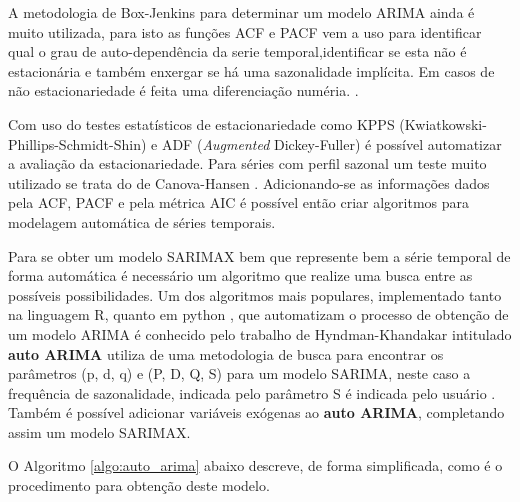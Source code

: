 A metodologia de Box-Jenkins \cite{hipel1977advances} para determinar um modelo ARIMA ainda é muito utilizada, para isto as funções ACF e PACF vem a uso para identificar qual o grau de auto-dependência da serie temporal,identificar se esta não é estacionária e também enxergar se há uma sazonalidade implícita. Em casos de não estacionariedade é feita uma diferenciação numéria. \cite{hipel1977advances,atique2019forecasting, hyndman2020forecasting}.

Com uso do testes estatísticos de estacionariedade como KPPS (Kwiatkowski\hyp{}Phillips\hyp{}Schmidt\hyp{}Shin) \cite{kwiatkowski1992testing} e ADF (\textit{Augmented} Dickey\hyp{}Fuller) \cite{dickey1979distribution} é possível automatizar a avaliação da estacionariedade. Para séries com perfil sazonal um teste muito utilizado se trata do de Canova-Hansen \cite{canova1995seasonal}. Adicionando-se as informações dados pela ACF, PACF e pela métrica AIC é possível então criar algoritmos para modelagem automática de séries temporais.

Para se obter um modelo SARIMAX bem que represente bem a série temporal de forma automática é necessário um algoritmo que realize uma busca entre as possíveis possibilidades. Um dos algoritmos mais populares, implementado tanto na linguagem R, quanto em python \cite{smith2017pmdarima}, que automatizam o processo de obtenção de um modelo ARIMA é conhecido pelo trabalho de Hyndman-Khandakar intitulado \textbf{auto ARIMA} \cite{hyndman2007automatic, hyndman2020forecasting} utiliza de uma metodologia de busca para encontrar os parâmetros (p, d, q) e (P, D, Q, S) para um modelo SARIMA, neste caso a frequência de sazonalidade, indicada pelo parâmetro S é indicada pelo usuário \cite{hyndman2007automatic, smith2017pmdarima}. Também é possível adicionar variáveis exógenas ao \textbf{auto ARIMA}, completando assim um modelo SARIMAX.

O Algoritmo \ref{algo:auto_arima} abaixo descreve, de forma simplificada, como é o procedimento para obtenção deste modelo.

